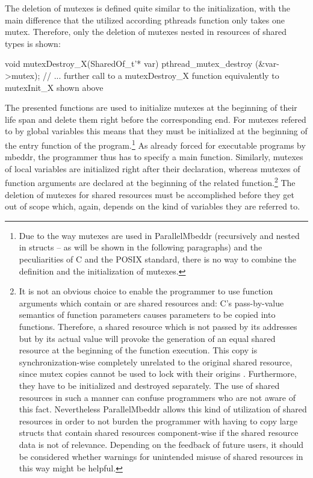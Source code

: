 The deletion of mutexes is defined quite similar to the initialization, with the main difference that the utilized according pthreads function only takes one mutex. Therefore, only the deletion of mutexes nested in resources of shared types is shown:
\begin{ccode}
void mutexDestroy_X(SharedOf_t'* var) { 
  pthread_mutex_destroy (&var->mutex); 
  // ... further call to a mutexDestroy_X function equivalently to mutexInit_X shown above
}
\end{ccode}
The presented functions are used to initialize mutexes at the beginning of their life span and delete them right before the corresponding end. For mutexes refered to by global variables this means that they must be initialized at the beginning of the entry function of the program.\footnote{Due to the way mutexes are used in ParallelMbeddr (recursively and nested in structs -- as will be shown in the following paragraphs) and the peculiarities of C and the POSIX standard, there is no way to combine the definition and the initialization of mutexes.} As already forced for executable programs by mbeddr, the programmer thus has to specify a main function. Similarly, mutexes of local variables are initialized right after their declaration, whereas mutexes of function arguments are declared at the beginning of the related function.\footnote{\label{mutexCopies}It is not an obvious choice to enable the programmer to use function arguments which contain or are shared resources and: C's pass-by-value semantics of function parameters causes parameters to be copied into functions. Therefore, a shared resource which is not passed by its addresses but by its actual value will provoke the generation of an equal shared resource at the beginning of the function execution. This copy is synchronization-wise completely unrelated to the original shared resource, since mutex copies cannot be used to lock with their origins \cite{Mutexes}. Furthermore, they have to be initialized and destroyed separately. The use of shared resources in such a manner can confuse programmers who are not aware of this fact. Nevertheless ParallelMbeddr allows this kind of utilization of shared resources in order to not burden the programmer with having to copy large structs that contain shared resources component-wise if the shared resource data is not of relevance. Depending on the feedback of future users, it should be considered whether warnings for unintended misuse of shared resources in this way might be helpful.} The deletion of mutexes for shared resources must be accomplished before they get out of scope which, again, depends on the kind of variables they are referred to. 

